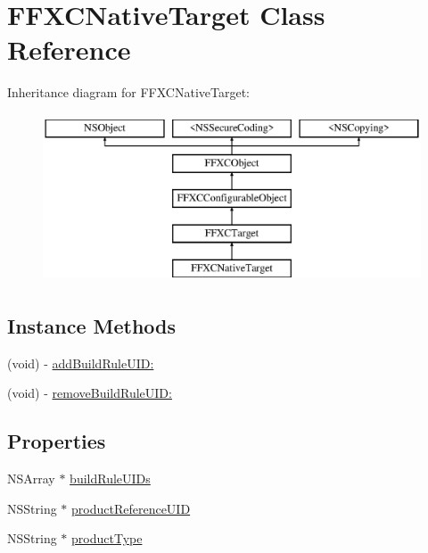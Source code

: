 \hypertarget{interface_f_f_x_c_native_target}{\section{F\-F\-X\-C\-Native\-Target Class Reference}
\label{interface_f_f_x_c_native_target}
}
Inheritance diagram for F\-F\-X\-C\-Native\-Target\-:\begin{figure}[H]
\begin{center}
\leavevmode
\includegraphics[height=5.000000cm]{interface_f_f_x_c_native_target}
\end{center}
\end{figure}
\subsection*{Instance Methods}
\begin{DoxyCompactItemize}
\item 
(void) -\/ \hyperlink{interface_f_f_x_c_native_target_a4bdf8ae29d9d42620a43fb533b0a37b8}{add\-Build\-Rule\-U\-I\-D\-:}
\item 
(void) -\/ \hyperlink{interface_f_f_x_c_native_target_a4ff3a4e224ba3bab7b2bfa594ae38a06}{remove\-Build\-Rule\-U\-I\-D\-:}
\end{DoxyCompactItemize}
\subsection*{Properties}
\begin{DoxyCompactItemize}
\item 
N\-S\-Array $\ast$ \hyperlink{interface_f_f_x_c_native_target_a881d7216349651546c101b1b0ca569ab}{build\-Rule\-U\-I\-Ds}
\item 
N\-S\-String $\ast$ \hyperlink{interface_f_f_x_c_native_target_a0a3459af4b56178e0715784b632583ad}{product\-Reference\-U\-I\-D}
\item 
N\-S\-String $\ast$ \hyperlink{interface_f_f_x_c_native_target_a97378a0bfb4140fa4b9f40a8161ffac7}{product\-Type}
\end{DoxyCompactItemize}


